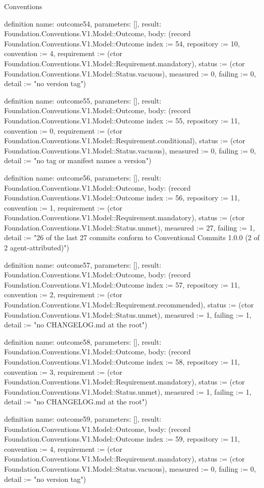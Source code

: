\begin{lexlean}{Conventions}
\begin{semanticmodule}
definition{
  name: outcome54,
  parameters: [],
  result: Foundation.Conventions.V1.Model::Outcome,
  body: (record Foundation.Conventions.V1.Model::Outcome {index := 54, repository := 10, convention := 4, requirement := (ctor Foundation.Conventions.V1.Model::Requirement.mandatory), status := (ctor Foundation.Conventions.V1.Model::Status.vacuous), measured := 0, failing := 0, detail := "no version tag"})
}

definition{
  name: outcome55,
  parameters: [],
  result: Foundation.Conventions.V1.Model::Outcome,
  body: (record Foundation.Conventions.V1.Model::Outcome {index := 55, repository := 11, convention := 0, requirement := (ctor Foundation.Conventions.V1.Model::Requirement.conditional), status := (ctor Foundation.Conventions.V1.Model::Status.vacuous), measured := 0, failing := 0, detail := "no tag or manifest names a version"})
}

definition{
  name: outcome56,
  parameters: [],
  result: Foundation.Conventions.V1.Model::Outcome,
  body: (record Foundation.Conventions.V1.Model::Outcome {index := 56, repository := 11, convention := 1, requirement := (ctor Foundation.Conventions.V1.Model::Requirement.mandatory), status := (ctor Foundation.Conventions.V1.Model::Status.unmet), measured := 27, failing := 1, detail := "26 of the last 27 commits conform to Conventional Commits 1.0.0 (2 of 2 agent-attributed)"})
}

definition{
  name: outcome57,
  parameters: [],
  result: Foundation.Conventions.V1.Model::Outcome,
  body: (record Foundation.Conventions.V1.Model::Outcome {index := 57, repository := 11, convention := 2, requirement := (ctor Foundation.Conventions.V1.Model::Requirement.recommended), status := (ctor Foundation.Conventions.V1.Model::Status.unmet), measured := 1, failing := 1, detail := "no CHANGELOG.md at the root"})
}

definition{
  name: outcome58,
  parameters: [],
  result: Foundation.Conventions.V1.Model::Outcome,
  body: (record Foundation.Conventions.V1.Model::Outcome {index := 58, repository := 11, convention := 3, requirement := (ctor Foundation.Conventions.V1.Model::Requirement.mandatory), status := (ctor Foundation.Conventions.V1.Model::Status.unmet), measured := 1, failing := 1, detail := "no CHANGELOG.md at the root"})
}

definition{
  name: outcome59,
  parameters: [],
  result: Foundation.Conventions.V1.Model::Outcome,
  body: (record Foundation.Conventions.V1.Model::Outcome {index := 59, repository := 11, convention := 4, requirement := (ctor Foundation.Conventions.V1.Model::Requirement.mandatory), status := (ctor Foundation.Conventions.V1.Model::Status.vacuous), measured := 0, failing := 0, detail := "no version tag"})
}


\end{semanticmodule}
\end{lexlean}
